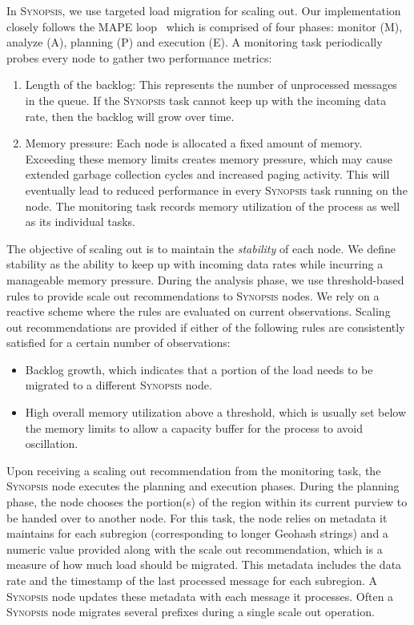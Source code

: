 In \textsc{Synopsis}, we use targeted load migration for scaling out.
Our implementation closely follows the MAPE loop~\cite{maurer2011revealing} which is comprised of four phases: monitor (M), analyze (A), planning (P) and execution (E).
A monitoring task periodically probes every node to gather two performance metrics:
\begin{enumerate}[leftmargin=*]
	\item Length of the backlog: This represents the number of unprocessed messages in the queue. If the \textsc{Synopsis} task cannot keep up with the incoming data rate, then the backlog will grow over time.
	\item Memory pressure: Each node is allocated a fixed amount of memory. 
	Exceeding these memory limits creates memory pressure, which may cause extended garbage collection cycles and increased paging activity. 
	This will eventually lead to reduced performance in every \textsc{Synopsis} task running on the node.
	The monitoring task records memory utilization of the process as well as its individual tasks.
\end{enumerate} 

The objective of scaling out is to maintain the \emph{stability} of each node.
We define stability as the ability to keep up with incoming data rates while incurring a manageable memory pressure.  During the analysis phase, we use threshold-based rules \cite{lorido2012auto} to provide scale out recommendations to \textsc{Synopsis} nodes.
We rely on a reactive scheme where the rules are evaluated on current observations.
Scaling out recommendations are provided if either of the following rules are consistently satisfied for a certain number of observations:
\begin{itemize}[leftmargin=*]  
\item Backlog growth, which indicates that a portion of the load needs to be migrated to a different \textsc{Synopsis} node.
\item High overall memory utilization above a threshold, which is usually set below the memory limits to allow a capacity buffer for the process to avoid oscillation.
\end{itemize}

Upon receiving a scaling out recommendation from the monitoring task, the \textsc{Synopsis} node executes the planning and execution phases.
During the planning phase, the node chooses the portion(s) of the region within its current purview to be handed over to another node.
For this task, the node relies on metadata it maintains for each subregion (corresponding to longer Geohash strings) and a numeric value provided along with the scale out recommendation, which is a measure of how much load should be migrated.
This metadata includes the data rate and the timestamp of the last processed message for each subregion.
A \textsc{Synopsis} node updates these metadata with each message it processes.
Often a \textsc{Synopsis} node migrates several prefixes during a single scale out operation.

